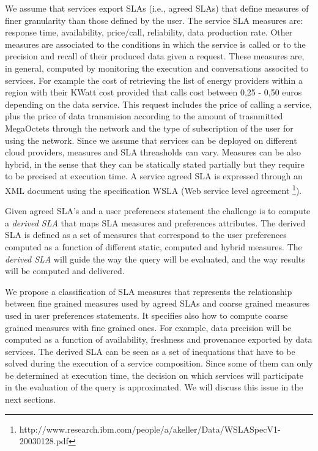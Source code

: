 We assume that services export SLAs (i.e., agreed SLAs) that define measures  of finer granularity than those defined by the user.  The service SLA measures  are: response time, availability, price/call, reliability, data production rate. Other measures are associated to the conditions in which the service is called or to the precision and recall of their produced data given a request. These measures are, in general, computed by monitoring the execution and conversations associted to services. For example the cost of retrieving the list of energy providers within a region with their KWatt cost provided that calls cost between 0,25 - 0,50 euros depending on the data service. This request  includes the price of calling a service, plus the price of data transmision according to the amount of trasnmitted MegaOctets through the network and the type of subscription of the user for using the network. Since we assume that services can be deployed on different cloud providers, measures and SLA threasholds can vary.
 Measures can be also hybrid, in the sense that they can be statically stated partially but they require to be precised at execution time.  A service  agreed SLA is expressed through an  XML document using the specification WSLA (Web service level agreement \footnote{\footnotesize http://www.research.ibm.com/people/a/akeller/\-Data/WSLASpecV1-20030128.pdf}).


Given agreed SLA's and a user preferences statement the challenge is to compute a  {\em derived SLA} that  maps SLA measures and preferences attributes.  The derived SLA is defined as a set of measures that correspond to the user preferences computed as a function of different static, computed and hybrid measures. The {\em derived SLA}  will guide the way the query will be evaluated, and the way results will be computed and delivered.

 We propose a classification of SLA measures that represents the relationship between fine grained measures used by agreed SLAs and coarse grained measures used in user preferences statements. It specifies also how to compute coarse grained measures with fine grained ones. For example, data precision will be computed as a function of availability, freshness and provenance exported by data services. The derived SLA  can be seen as a set of inequations that have to be solved during the execution of a service composition. Since some of them can only be determined at execution time, the decision on which services will participate in the evaluation of the query is approximated. We will discuss this issue in the next sections.


